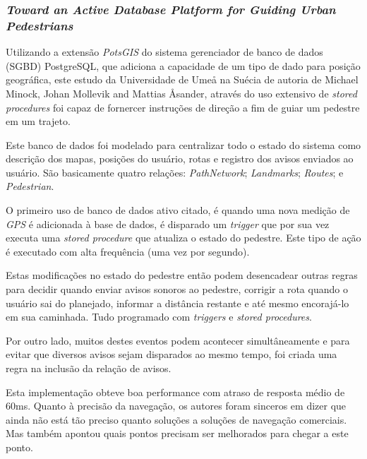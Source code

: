 \documentclass[conference]{IEEEtran}
\begin{document}
    \subsubsection{\textit{Toward an Active Database Platform for Guiding Urban Pedestrians}}
    Utilizando a extensão \textit{PotsGIS} do sistema gerenciador de banco de dados (SGBD) PostgreSQL, que adiciona a capacidade de um tipo de dado para posição geográfica, este estudo da Universidade de Ume\r{a} na Suécia de autoria de Michael Minock, Johan Mollevik and Mattias \r{A}sander, através do uso extensivo de \textit{stored procedures} foi capaz de fornercer instruções de direção a fim de guiar um pedestre em um trajeto.

    Este banco de dados foi modelado para centralizar todo o estado do sistema como descrição dos mapas, posições do usuário, rotas e registro dos avisos enviados ao usuário. São basicamente quatro relações: \textit{PathNetwork}; \textit{Landmarks}; \textit{Routes}; e \textit{Pedestrian}.

    O primeiro uso de banco de dados ativo citado, é quando uma nova medição de \textit{GPS} é adicionada à base de dados, é disparado um \textit{trigger} que por sua vez executa uma \textit{stored procedure} que atualiza o estado do pedestre. Este tipo de ação é executado com alta frequência (uma vez por segundo).

    Estas modificações no estado do pedestre então podem desencadear outras regras para decidir quando enviar avisos sonoros ao pedestre, corrigir a rota quando o usuário sai do planejado, informar a distância restante e até mesmo encorajá-lo em sua caminhada. Tudo programado com \textit{triggers} e \textit{stored procedures}.

    Por outro lado, muitos destes eventos podem acontecer simultâneamente e para evitar que diversos avisos sejam disparados ao mesmo tempo, foi criada uma regra na inclusão da relação de avisos.

    Esta implementação obteve boa performance com atraso de resposta médio de 60ms. Quanto à precisão da navegação, os autores foram sinceros em dizer que ainda não está tão preciso quanto soluções a soluções de navegação comerciais. Mas também apontou quais pontos precisam ser melhorados para chegar a este ponto.
\end{document}
